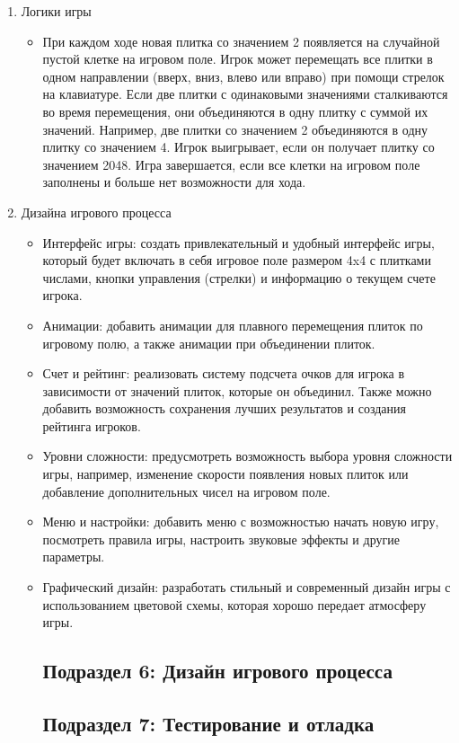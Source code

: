 \begin{enumerate}
\item Логики игры
\begin{itemize}
\item При каждом ходе новая плитка со значением 2 появляется на случайной пустой клетке на игровом поле. Игрок может перемещать все плитки в одном направлении (вверх, вниз, влево или вправо) при помощи стрелок на клавиатуре.
Если две плитки с одинаковыми значениями сталкиваются во время перемещения, они объединяются в одну плитку с суммой их значений. Например, две плитки со значением 2 объединяются в одну плитку со значением 4.
Игрок выигрывает, если он получает плитку со значением 2048. Игра завершается, если все клетки на игровом поле заполнены и больше нет возможности для хода.
\end{itemize}
\item Дизайна игрового процесса
\begin{itemize}
\item Интерфейс игры: создать привлекательный и удобный интерфейс игры, который будет включать в себя игровое поле размером 4x4 с плитками числами, кнопки управления (стрелки) и информацию о текущем счете игрока.

\item Анимации: добавить анимации для плавного перемещения плиток по игровому полю, а также анимации при объединении плиток.

\item Счет и рейтинг: реализовать систему подсчета очков для игрока в зависимости от значений плиток, которые он объединил. Также можно добавить возможность сохранения лучших результатов и создания рейтинга игроков.

\item Уровни сложности: предусмотреть возможность выбора уровня сложности игры, например, изменение скорости появления новых плиток или добавление дополнительных чисел на игровом поле.

\item Меню и настройки: добавить меню с возможностью начать новую игру, посмотреть правила игры, настроить звуковые эффекты и другие параметры.

\item Графический дизайн: разработать стильный и современный дизайн игры с использованием цветовой схемы, которая хорошо передает атмосферу игры.
\subsection{\label{subsec:ch01/sec01/sub02}Подраздел 6: Дизайн игрового процесса}
\subsection{\label{subsec:ch01/sec01/sub02}Подраздел 7: Тестирование и отладка}
\end{itemize}
\end{enumerate}
